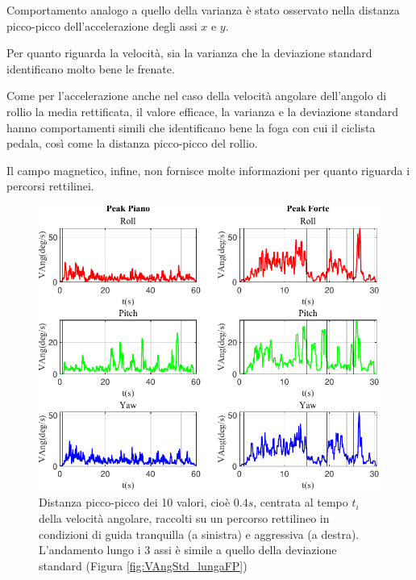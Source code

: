 \documentclass[class=article]{standalone}
\begin{document}
	Comportamento analogo a quello della varianza è stato osservato nella distanza picco-picco dell'accelerazione degli assi \(x\) e \(y\).\hfill\break
	
	Per quanto riguarda la velocità, sia la varianza che la deviazione standard identificano molto bene le frenate.\hfill\break
	
	Come per l'accelerazione anche nel caso della velocità angolare dell'angolo di rollio la media rettificata, il valore efficace, la varianza e la deviazione standard hanno comportamenti simili che identificano bene la foga con cui il ciclista pedala, così come la distanza picco-picco del rollio.\hfill\break
	
	Il campo magnetico, infine, non fornisce molte informazioni per quanto riguarda i percorsi rettilinei.

	
	\begin{center}
		\begin{figure}[h!]
			\centering\includegraphics[width=.7\textwidth]{img/lungaFP/VAng/Peak}
			\caption[]{Distanza picco-picco dei 10 valori, cioè \(0.4s\), centrata al tempo \(t_{i}\) della velocità angolare, raccolti su un percorso rettilineo in condizioni di guida tranquilla (a sinistra) e aggressiva (a destra). L'andamento lungo i 3 assi è simile a quello della deviazione standard (Figura \ref{fig:VAngStd_lungaFP})}
			\label{fig:VAngPeak_lungaFP}
		\end{figure}
	\end{center}
\end{document}
